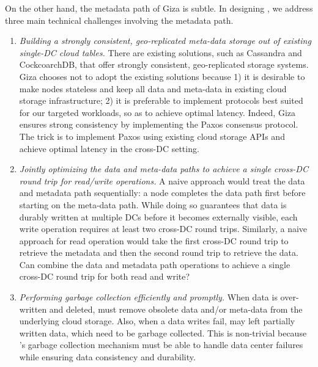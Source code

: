 On the other hand, the metadata path of Giza is subtle.
In designing \name, we address three main technical challenges involving the metadata path.
\begin{enumerate}

\item {\it Building a strongly consistent, geo-replicated meta-data storage out of existing 
single-DC cloud tables.}
There are existing solutions, such as Cassandra and CockcoarchDB,
that offer strongly consistent, geo-replicated storage systems.
Giza chooses not to adopt the existing solutions because
1) it is desirable to make \name nodes stateless and keep all data and meta-data
in existing cloud storage infrastructure;
2) it is preferable to implement protocols best suited for our targeted workloads,
so as to achieve optimal latency.
Indeed, Giza ensures strong consistency by implementing the Paxos consensus protocol.
The trick is to implement Paxos using existing cloud storage APIs and achieve 
optimal latency in the cross-DC setting.

\item {\it Jointly optimizing the data and meta-data paths to achieve a single
cross-DC round trip for read/write operations.}
A naive approach would treat the data and metadata path sequentially:
a \name node completes the data path first before starting on the meta-data path.
While doing so guarantees that data is durably written at multiple DCs
before it becomes externally visible, each write operation requires at least two cross-DC round trips.
Similarly, a naive approach for read operation would take the first cross-DC round trip to retrieve the metadata
and then the second round trip to retrieve the data.
Can \name combine the data and metadata path operations to achieve a single cross-DC round trip for both read and write?

\item {\it Performing garbage collection efficiently and promptly.} 
When data is over-written and deleted, \name must remove obsolete data and/or meta-data from
the underlying cloud storage. Also, when a data writes fail, \name may left partially written data, which need to be
garbage collected.  
This is non-trivial because \name's garbage 
collection mechanism must be able to handle data center failures while ensuring data 
consistency and durability.

\end{enumerate}

%


